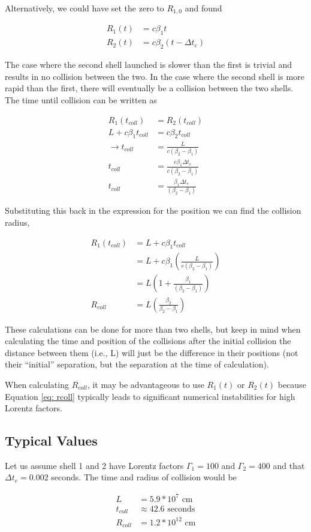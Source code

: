 \documentclass[linenumbers]{aastex631}
\begin{document}
\begin{appendix}
Alternatively, we could have set the zero to $R_{1,0}$ and found 

\begin{align}
	R_1(t) &= c\beta_1 t \\
	R_2(t) &= c\beta_2 (t-\Delta t_e)
\end{align}

The case where the second shell launched is slower than the first is trivial and results in no collision between the two. In the case where the second shell is more rapid than the first, there will eventually be a collision between the two shells. The time until collision can be written as

\begin{align}
	R_1(t_{coll}) &= R_2(t_{coll}) \\ 
	L + c\beta_1t_{coll}&= c\beta_2t_{coll}\\
	\rightarrow t_{coll}&= \frac{L}{c(\beta_2 - \beta_1)}\\
	t_{coll}&= \frac{c\beta_1 \Delta t_e}{c(\beta_2 - \beta_1)}\\
	t_{coll}&= \frac{\beta_1 \Delta t_e}{(\beta_2 - \beta_1)}
\end{align}

Substituting this back in the expression for the position we can find the collision radius, 

\begin{align}
	R_1(t_{coll}) &= L + c\beta_1 t_{coll} \\
	&= L+c\beta_1\left(\frac{L}{c(\beta_2-\beta_1)}\right) \\
	&= L\left(1+\frac{\beta_1}{(\beta_2-\beta_1)}\right)\\
	R_{coll} &= L\left(\frac{\beta_2}{\beta_2-\beta_1}\right) \label{eq: rcoll}
\end{align}

These calculations can be done for more than two shells, but keep in mind when calculating the time and position of the collisions after the initial collision the distance between them (i.e., L) will just be the difference in their positions (not their ``initial'' separation, but the separation at the time of calculation).

When calculating $R_{coll}$, it may be advantageous to use $R_1(t)$ or $R_2(t)$
because Equation \ref{eq: rcoll} typically leads to significant numerical instabilities for high Lorentz factors.

\subsection{Typical Values}

Let us assume shell 1 and 2 have Lorentz factors $\Gamma_1=100$ and $\Gamma_2=400$ and that $\Delta t_e = 0.002$ seconds. The time and radius of collision would be

\begin{align}
	L &= 5.9 * 10^7 \text{ cm} \\ 
	t_{coll} &\approx 42.6 \text{ seconds}\\
	R_{coll} &= 1.2*10^{12} \text{ cm}
\end{align}

\end{appendix}
\end{document}
